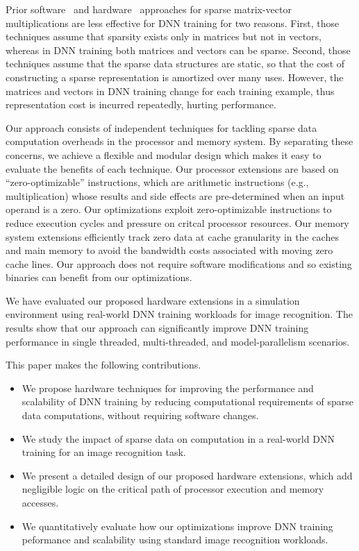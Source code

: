 Prior software~\cite{Eisenstat82, IntelSparseMatrix} and hardware~\cite{Carter99, Srinidhi12, Fowers13} approaches for sparse matrix-vector multiplications are less effective for DNN training for two reasons.  First, those techniques assume that sparsity exists only in matrices but not in vectors, whereas in DNN training both matrices and vectors can be sparse.  Second, those techniques assume that the sparse data structures are static, so that the cost of constructing a sparse representation is amortized over many uses.  However, the matrices and vectors in DNN training change for each training example, thus representation cost is incurred repeatedly, hurting performance. 

Our approach consists of independent techniques for tackling sparse data computation overheads in the processor and memory system.  By separating these concerns, we achieve a flexible and modular design which makes it easy to evaluate the benefits of each technique.  Our processor extensions are based on ``zero-optimizable'' instructions, which are arithmetic instructions (e.g., multiplication) whose results and side effects are pre-determined when an input operand is a zero. Our optimizations exploit zero-optimizable instructions to reduce execution cycles and pressure on critcal processor resources.  Our memory system extensions efficiently track zero data at cache granularity in the caches and main memory to avoid the bandwidth costs associated with moving zero cache lines. Our approach does not require software modifications and so existing binaries can benefit from our optimizations. 

We have evaluated our proposed hardware extensions in a simulation environment using real-world DNN training workloads for image recognition. The results show that our approach can significantly improve DNN training performance in single threaded, multi-threaded, and model-parallelism scenarios.

This paper makes the following contributions.
\begin{itemize}

\item We propose hardware techniques for improving the performance and scalability of DNN training by reducing computational requirements of sparse data computations, without requiring software changes. 
\item We study the impact of sparse data on computation in a real-world DNN training for an image recognition task. 
\item We present a detailed design of our proposed hardware extensions, which add negligible logic on the critical path of processor execution and memory accesses. 
\item We quantitatively evaluate how our optimizations improve DNN training peformance and scalability using standard image recognition workloads. 

\end{itemize}

